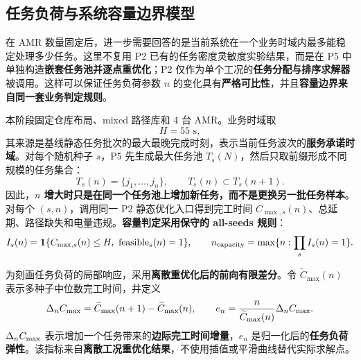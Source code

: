 \subsection{任务负荷与系统容量边界模型}

在 AMR 数量固定后，进一步需要回答的是当前系统在一个业务时域内最多能稳定处理多少任务。这里不复用 P2 已有的任务密度灵敏度实验结果，而是在 P5 中单独构造\textbf{嵌套任务池并逐点重优化}；P2 仅作为单个工况的\textbf{任务分配与排序求解器}被调用。这样可以保证任务负荷参数 $n$ 的变化具有\textbf{严格可比性}，并且\textbf{容量边界来自同一套业务判定规则}。

本阶段固定仓库布局、mixed 路径库和 4 台 AMR。业务时域取
\begin{equation}
H=55\text{ s},
\end{equation}
其来源是基线静态任务批次的最大最晚完成时刻，表示当前任务波次的\textbf{服务承诺时域}。对每个随机种子 $s$，P5 先生成最大任务池 $T_s(N)$，然后只取前缀形成不同规模的任务集合：
\begin{equation}
T_s(n)=\{j_1,\ldots,j_n\},\qquad T_s(n)\subset T_s(n+1).
\end{equation}
因此，\textbf{$n$ 增大时只是在同一个任务池上增加新任务，而不是更换另一批任务样本}。对每个 $(s,n)$，调用同一 P2 静态优化入口得到完工时间 $C_{\max,s}(n)$、总延期、路径缺失和电量违规。\textbf{容量判定采用保守的 all-seeds 规则}：
\begin{equation}
I_s(n)=\indicator\{C_{\max,s}(n)\le H,\ \text{feasible}_s(n)=1\},
\qquad
n_{\mathrm{capacity}}=\max\{n:\prod_s I_s(n)=1\}.
\end{equation}

为刻画任务负荷的局部响应，采用\textbf{离散重优化后的前向有限差分}。令
\(\widetilde{C}_{\max}(n)\) 表示多种子中位数完工时间，并定义
\begin{equation}
\Delta_n C_{\max}=\widetilde{C}_{\max}(n+1)-\widetilde{C}_{\max}(n),
\qquad
e_n=\frac{n}{\widetilde{C}_{\max}(n)}\Delta_n C_{\max}.
\end{equation}
$\Delta_nC_{\max}$ 表示增加一个任务带来的\textbf{边际完工时间增量}，$e_n$ 是归一化后的\textbf{任务负荷弹性}。该指标来自\textbf{离散工况重优化结果}，不使用插值或平滑曲线替代实际求解点。

